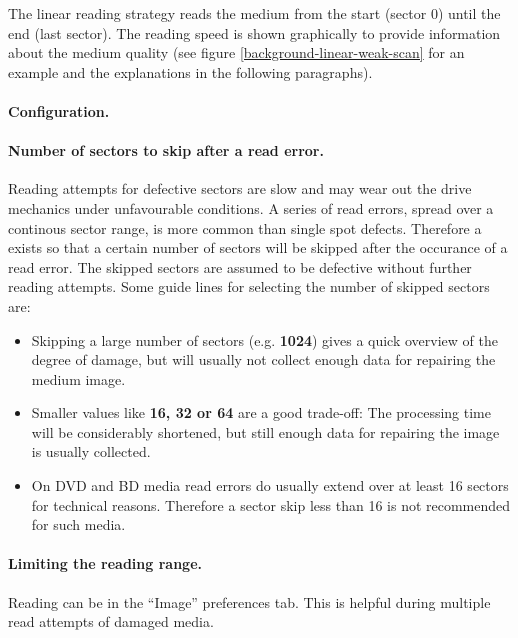 The linear reading strategy reads the medium from the start (sector 0)
until the end (last sector). The reading speed is shown graphically to
provide information about the medium quality (see
figure \ref{background-linear-weak-scan} for an example and the explanations
in the following paragraphs). 

\paragraph{Configuration.}\quad

\medskip

\paragraph{Number of sectors to skip after a read error.} Reading
attempts for defective sectors are slow and may wear out the drive
mechanics under unfavourable conditions. A series of read errors,
spread over a continous sector range, is more common than single spot defects.
Therefore a  exists
so that a certain number of sectors
will be skipped after the occurance of a read error. The skipped sectors are
assumed to be defective without further reading attempts. Some guide lines for
selecting the number of skipped sectors are:

\begin{itemize}
\item Skipping a large number of sectors (e.g. {\bf 1024}) gives a quick
  overview of the degree of damage, but will usually not collect enough
  data for repairing the medium image.
\item Smaller values like {\bf 16, 32 or 64} are a good trade-off: The processing
  time will be considerably shortened, but still enough data for repairing
  the image is usually collected.
\item On DVD and BD  media read errors do usually extend over at least 16 sectors
  for technical reasons. Therefore a sector skip less than 16 is not recommended
  for such  media.
\end{itemize}

\paragraph{Limiting the reading range.}

\medskip

Reading can
be  in
the ``Image'' preferences tab. This is helpful during
multiple read attempts of damaged media. 

